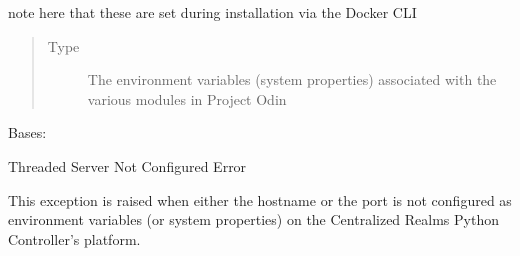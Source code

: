 \documentclass[letterpaper,10pt,english]{sphinxmanual}
\begin{document}
\begin{fulllineitems}
\begin{fulllineitems}
\begin{quote}
\begin{description}
\end{description}\end{quote}

\end{fulllineitems}


\end{fulllineitems}


\begin{fulllineitems}
\label{\detokenize{Forge:Forge.TOPIC_NAME_SEPARATOR}}
\sphinxAtStartPar
note here that these
are set during installation via the Docker CLI
\begin{quote}\begin{description}
\item[{Type}] \leavevmode
\sphinxAtStartPar
The environment variables (system properties) associated with the various modules in Project Odin

\end{description}\end{quote}

\end{fulllineitems}


\begin{fulllineitems}
\label{\detokenize{Forge:Forge.ThreadedServerNotConfiguredError}}
\sphinxAtStartPar
Bases: 

\sphinxAtStartPar
Threaded Server Not Configured Error

\sphinxAtStartPar
This exception is raised when either the hostname or the port is not configured as environment variables (or system
properties) on the Centralized Realms Python Controller’s platform.

\end{fulllineitems}

\end{document}
